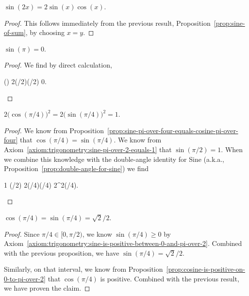 \begin{proposition}\label{prop:double-angle-for-sine}
$\sin(2x) = 2\sin(x)\cos(x)$.
\end{proposition}

\begin{proof}
  This follows immediately from the previous result, Proposition~\ref{prop:sine-of-sum}, by choosing $x=y$.
\end{proof}

\begin{proposition}
$\sin(\pi) = 0$.
\end{proposition}

\begin{proof}
We find by direct calculation,
\begin{calculation}
  \sin(\pi)
  2\sin(\pi/2)\cos(\pi/2)
  0.\qedhere
\end{calculation}
\end{proof}

\begin{proposition}
$2\bigl(\cos(\pi/4)\bigr)^{2} = 2\bigl(\sin(\pi/4)\bigr)^{2} = 1$.
\end{proposition}
\begin{proof}
We know from Proposition~\ref{prop:sine-pi-over-four-equals-cosine-pi-over-four}
that $\cos(\pi/4)=\sin(\pi/4)$. We know from Axiom~\ref{axiom:trigonometry:sine-pi-over-2-equals-1} that $\sin(\pi/2)=1$.
When we combine this knowledge with the double-angle identity for Sine
(a.k.a., Proposition~\ref{prop:double-angle-for-sine}) we find
\begin{calculation}
  1
  \sin(\pi/2)
  2\sin(\pi/4)\cos(\pi/4)
  2\sin^{2}(\pi/4).\qedhere
\end{calculation}
\end{proof}

\begin{proposition}\label{prop:sine-of-pi-over-four}\label{prop:cosine-of-pi-over-four}
$\cos(\pi/4) = \sin(\pi/4) = \sqrt{2}/2$.
\end{proposition}

\begin{proof}
Since $\pi/4\in[0,\pi/2)$, we know $\sin(\pi/4)\geq 0$ by Axiom~\ref{axiom:trigonometry:sine-is-positive-between-0-and-pi-over-2}. Combined with the
  previous proposition, we have $\sin(\pi/4) = \sqrt{2}/2$.

Similarly, on that interval, we know from Proposition~\ref{prop:cosine-is-positive-on-0-to-pi-over-2}
that $\cos(\pi/4)$ is positive. Combined with the previous result, we have
proven the claim.
\end{proof}

